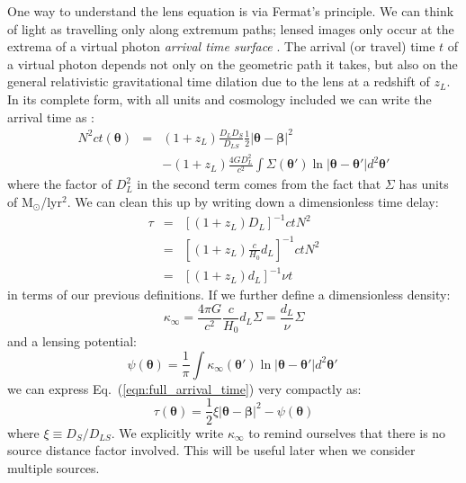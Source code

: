 \documentclass[galley,usenatbib]{mn2e}
\newcommand{\Msun}{\ensuremath{\mathrm{M}_\odot}}
\newcommand{\eqnref}[1] {Eq.~(\ref{#1})}
\renewcommand{\vec}[1]{\ensuremath{\boldsymbol{#1}}}
\begin{document}
One way to understand the lens equation is via Fermat's principle. We can think of light as travelling only 
along extremum paths; lensed images only occur at the extrema of a virtual photon {\it arrival time surface} 
\citep{1986ApJ...310..568B}. The arrival (or travel) time $t$ of a virtual photon depends not only on the geometric
path it takes, but also on the general relativistic gravitational time dilation
due to the lens at a redshift of $z_L$.  In its complete form, with all units
and cosmology included we can write the arrival time as \citep{1986ApJ...310..568B}:
%
\begin{eqnarray}
N^2ct(\vec\theta) & = & (1+z_L)\frac{D_{L}D_{S}}{D_{LS}}\frac12 |\vec\theta - \vec\beta|^2 \nonumber \\
& & - (1+z_L)\frac{4GD_{L}^2}{c^2}\int \Sigma(\vec\theta') \ln |\vec\theta-\vec\theta'| d^2\vec\theta'
\label{eqn:full_arrival_time}
\end{eqnarray}
%
where the factor of $D_L^2$ in the second term comes from the fact that $\Sigma$
has units of \Msun/lyr$^2$. We can clean this up by writing down a dimensionless time
delay:
%
\begin{eqnarray}
\tau & = & \left[(1+z_L)D_{L}\right]^{-1}ctN^2 \nonumber \\
& = & \left[ (1+z_L) \frac{c}{H_0}d_L\right]^{-1}ctN^2 \nonumber \\
& = & \left[ (1+z_L) d_L\right]^{-1}\nu t
\label{tau}
\end{eqnarray}
%
in terms of our previous definitions. If we
further define a dimensionless density:
%
\begin{equation}
\kappa_\infty = \frac{4\pi G}{c^2}\frac{c}{H_0}d_L\Sigma
              = \frac{d_L}{\nu}\Sigma
\end{equation}
%
and a lensing potential:
%
\begin{equation}
\psi(\vec\theta) = \frac1\pi \int \kappa_\infty(\vec\theta') \ln|\vec\theta - \vec\theta'| d^2\vec\theta'\
\label{lensing potential}
\end{equation}
%
we can express \eqnref{eqn:full_arrival_time} very compactly as:
%
\begin{equation}
\tau(\vec\theta) = \frac12 \xi |\vec\theta-\vec\beta|^2 - \psi(\vec\theta)
\label{arrival time}
\end{equation}
%
where $\xi \equiv D_{S}/D_{LS}$. We explicitly write $\kappa_\infty$ to remind ourselves
that there is no source distance factor involved. This will be useful later when we consider
multiple sources.
\end{document}
